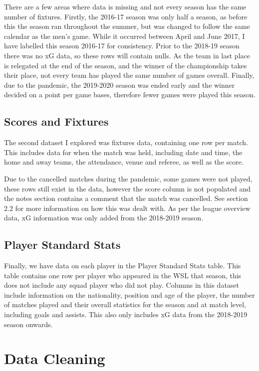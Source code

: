 \documentclass[12pt, a4paper, twocolumn]{article}
\begin{document}
There are a few areas where data is missing and not every season has the same number of fixtures. Firstly, the 2016-17 season was only half a season, as before this the season ran throughout the summer, but was changed to follow the same calendar as the men's game. While it occurred between April and June 2017, I have labelled this season 2016-17 for consistency. Prior to the 2018-19 season there was no xG data, so these rows will contain nulls. As the team in last place is relegated at the end of the season, and the winner of the championship takes their place, not every team has played the same number of games overall. Finally, due to the pandemic, the 2019-2020 season was ended early and the winner decided on a point per game bases, therefore fewer games were played this season.

\subsection{Scores and Fixtures}

The second dataset I explored was fixtures data\cite{fixtures}, containing one row per match. This includes data for when the match was held, including date and time, the home and away teams, the attendance, venue and referee, as well as the score.

Due to the cancelled matches during the pandemic, some games were not played, these rows still exist in the data, however the score column is not populated and the notes section contains a comment that the match was cancelled. See section 2.2 for more information on how this was dealt with. As per the league overview data, xG information was only added from the 2018-2019 season.

\subsection{Player Standard Stats}

Finally, we have data on each player in the Player Standard Stats table\cite{players}. This table contains one row per player who appeared in the WSL that season, this does not include any squad player who did not play. Columns in this dataset include information on the nationality, position and age of the player, the number of matches played and their overall statistics for the season and at match level, including goals and assists. This also only includes xG data from the 2018-2019 season onwards.

\section{Data Cleaning}
\end{document}
